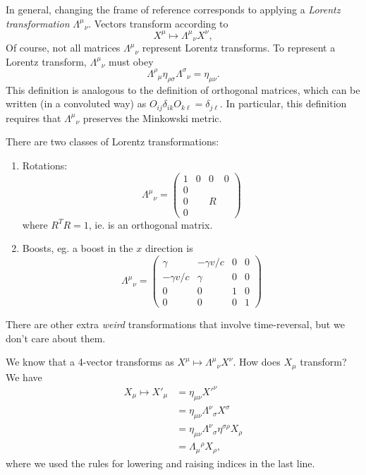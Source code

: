 \documentclass[a4paper]{article}
\begin{document}
In general, changing the frame of reference corresponds to applying a \emph{Lorentz transformation} $\Lambda^\mu\!_\nu$. Vectors transform according to
\[
  X^\mu \mapsto \Lambda^\mu\!_\nu X^\nu,
\]
Of course, not all matrices $\Lambda^\mu\!_\nu$ represent Lorentz transforms. To represent a Lorentz transform, $\Lambda^\mu\!_\nu$ must obey
\[
  \Lambda^\rho\!_\mu \eta_{\rho\sigma}\Lambda^\sigma\!_\nu = \eta_{\mu\nu}.
\]
This definition is analogous to the definition of orthogonal matrices, which can be written (in a convoluted way) as $O_{ij}\delta_{ik}O_{k\ell} = \delta_{j\ell}$. In particular, this definition requires that $\Lambda^\mu\!_\nu$ preserves the Minkowski metric.

There are two classes of Lorentz transformations:
\begin{enumerate}
  \item Rotations:
    \[
      \Lambda^\mu\!_\nu =
      \begin{pmatrix}
        1 & 0 & 0 & 0\\
        0 & \\
        0 & & R \\
        0
      \end{pmatrix}
    \]
    where $R^TR = 1$, ie. is an orthogonal matrix.
  \item Boosts, eg. a boost in the $x$ direction is
    \[
      \Lambda^\mu\!_\nu =
      \begin{pmatrix}
        \gamma & -\gamma v/c & 0 &0\\
        -\gamma v/c & \gamma & 0 & 0\\
        0 & 0 & 1 & 0\\
        0 & 0 & 0 & 1
      \end{pmatrix}
    \]
\end{enumerate}
There are other extra \emph{weird} transformations that involve time-reversal, but we don't care about them.

We know that a 4-vector transforms as $X^\mu \mapsto \Lambda^\mu\!_\nu X^\nu$. How does $X_\mu$ transform? We have
\begin{align*}
  X_\mu \mapsto X'_\mu &= \eta_{\mu\nu}X'^\nu\\
  &= \eta_{\mu\nu}\Lambda^\nu\!_\sigma X^\sigma\\
  &= \eta_{\mu\nu}\Lambda^\nu\!_\sigma\eta^{\sigma\rho}X_\rho\\
  &= \Lambda_\mu\!^\rho X_\rho,
\end{align*}
where we used the rules for lowering and raising indices in the last line.
\end{document}
